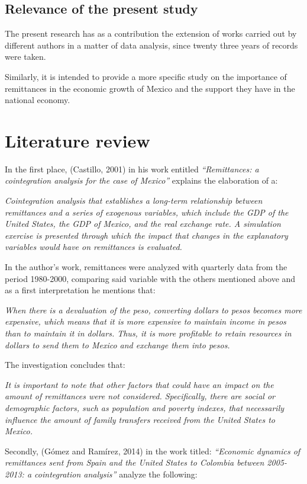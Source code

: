 \documentclass[12pt,english, spanish]{smfart}
\begin{document}
\subsection{Relevance of the present study}
The present research has as a contribution the extension of works carried out by different authors in a matter of data analysis, since twenty three years of records were taken. \par Similarly, it is intended to provide a more specific study on the importance of remittances in the economic growth of Mexico and the support they have in the national economy.

\section{Literature review}
In the first place, (Castillo, 2001) in his work entitled \textit{“Remittances: a cointegration analysis for the case of Mexico”} explains the elaboration of a:\par
\textit{Cointegration analysis that establishes a long-term relationship between remittances and a series of exogenous variables, which include the GDP of the United States, the GDP of Mexico, and the real exchange rate. A simulation exercise is presented through which the impact that changes in the explanatory variables would have on remittances is evaluated.}\par
In the author's work, remittances were analyzed with quarterly data from the period 1980-2000, comparing said variable with the others mentioned above and as a first interpretation he mentions that:\par
\textit{When there is a devaluation of the peso, converting dollars to pesos becomes more expensive, which means that it is more expensive to maintain income in pesos than to maintain it in dollars. Thus, it is more profitable to retain resources in dollars to send them to Mexico and exchange them into pesos.}\par	
The investigation concludes that:\par
\textit{It is important to note that other factors that could have an impact on the amount of remittances were not considered. Specifically, there are social or demographic factors, such as population and poverty indexes, that necessarily influence the amount of family transfers received from the United States to Mexico.}\par	
Secondly, (Gómez and Ramírez, 2014) in the work titled: \textit{“Economic dynamics of remittances sent from Spain and the United States to Colombia between 2005-2013: a cointegration analysis”} analyze the following:\par
\end{document}
